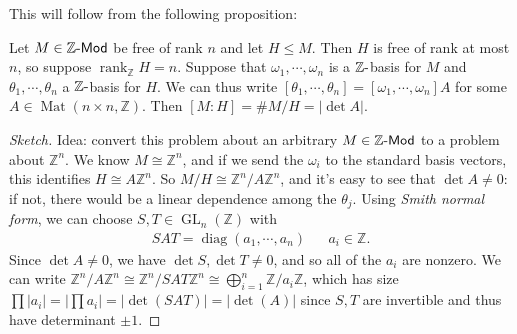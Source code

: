 \begin{remark}

This will follow from the following proposition:

\end{remark}

\begin{proposition}[Index = Determinant]

Let \(M \in {\mathbb{Z}{\hbox{-}}\mathsf{Mod}}\) be free of rank \(n\)
and let \(H \leq M\). Then \(H\) is free of rank at most \(n\), so
suppose \(\operatorname{rank}_{\mathbb{Z}}H = n\). Suppose that
\(\omega_1, \cdots, \omega_n\) is a \({\mathbb{Z}}{\hbox{-}}\)basis for
\(M\) and \(\theta_1, \cdots, \theta_n\) a
\({\mathbb{Z}}{\hbox{-}}\)basis for \(H\). We can thus write
\({\left[ { \theta_1, \cdots, \theta_n} \right]} = {\left[ { \omega_1, \cdots, \omega_n } \right]} A\)
for some \(A \in \operatorname{Mat}(n\times n, {\mathbb{Z}})\). Then
\([M: H] = \#M/H = {\left\lvert { \det A } \right\rvert}\).

\end{proposition}

\begin{proof}[Sketch]

Idea: convert this problem about an arbitrary
\(M \in {\mathbb{Z}{\hbox{-}}\mathsf{Mod}}\) to a problem about
\({\mathbb{Z}}^n\). We know \(M \cong {\mathbb{Z}}^n\), and if we send
the \(\omega_i\) to the standard basis vectors, this identifies
\(H \cong A {\mathbb{Z}}^n\). So
\(M/H \cong {\mathbb{Z}}^n/A{\mathbb{Z}}^n\), and it's easy to see that
\(\det A \neq 0\): if not, there would be a linear dependence among the
\(\theta_j\). Using \emph{Smith normal form}, we can choose
\(S, T \in \operatorname{GL}_n({\mathbb{Z}})\) with
\begin{align*}
SAT = \operatorname{diag}(a_1, \cdots, a_n) && a_i \in {\mathbb{Z}}
.\end{align*}
Since \(\det A \neq 0\), we have \(\det S, \det T \neq 0\), and so all
of the \(a_i\) are nonzero. We can write
\({\mathbb{Z}}^n/A{\mathbb{Z}}^n \cong {\mathbb{Z}}^n/SAT{\mathbb{Z}}^n \cong \bigoplus_{i=1}^n {\mathbb{Z}}/a_i {\mathbb{Z}}\),
which has size
\(\prod {\left\lvert {a_i} \right\rvert} = {\left\lvert { \prod a_i } \right\rvert} = {\left\lvert { \det (SAT) } \right\rvert} = {\left\lvert { \det(A) } \right\rvert}\)
since \(S, T\) are invertible and thus have determinant \(\pm 1\).

\end{proof}

